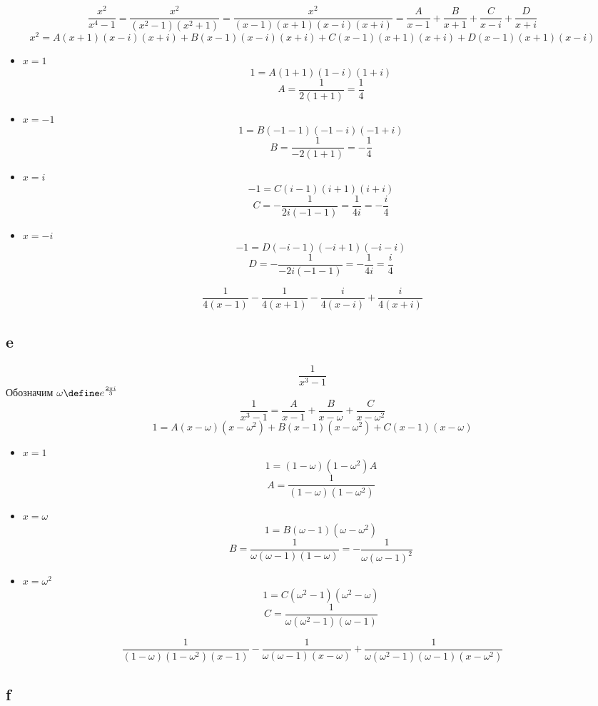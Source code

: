 $$ \frac{x^2}{x^4 - 1} = \frac{x^2}{(x^2 - 1)(x^2 + 1)} = \frac{x^2}{(x - 1)(x + 1)(x - i)(x + i)} = \frac{A}{x - 1} + \frac{B}{x + 1} + \frac{C}{x - i} + \frac{D}{x + i} $$
$$ x^2 = A(x + 1)(x - i)(x + i) + B(x - 1)(x - i)(x + i) + C(x - 1)(x + 1)(x + i) + D(x - 1)(x + 1)(x - i) $$
\begin{itemize}
	\item $ x = 1 $
    $$ 1 = A(1 + 1)(1 - i)(1 + i) $$
    $$ A = \frac1{2(1 + 1)} = \frac14 $$
    \item $ x = -1 $
    $$ 1 = B(-1 - 1)(-1 - i)(-1 + i) $$
    $$ B = \frac1{-2(1 + 1)} = -\frac14 $$
    \item $ x = i $
    $$ -1 = C(i - 1)(i + 1)(i + i) $$
    $$ C = -\frac1{2i(-1 - 1)} = \frac1{4i} = -\frac{i}4 $$
    \item $ x = -i $
    $$ -1 = D(-i - 1)(-i + 1)(-i - i) $$
    $$ D = -\frac1{-2i(-1 - 1)} = -\frac1{4i} = \frac{i}4 $$
\end{itemize}
$$ \frac1{4(x - 1)} - \frac1{4(x + 1)} - \frac{i}{4(x - i)} + \frac{i}{4(x + i)} $$

\subsection{e}

$$ \frac1{x^3 - 1} $$
Обозначим $ \omega \define e^{\frac{2\pi i}3} $
$$ \frac1{x^3 - 1} = \frac{A}{x - 1} + \frac{B}{x - \omega} + \frac{C}{x - \omega^2} $$
$$ 1 = A(x - \omega)(x - \omega^2) + B(x - 1)(x - \omega^2) + C(x - 1)(x - \omega) $$
\begin{itemize}
    \item $ x = 1 $
    $$ 1 = (1 - \omega)(1 - \omega^2)A $$
    $$ A = \frac1{(1 - \omega)(1 - \omega^2)} $$
	\item $ x = \omega $
    $$ 1 = B(\omega - 1)(\omega - \omega^2) $$
    $$ B = \frac1{\omega(\omega - 1)(1 - \omega)} = -\frac1{\omega(\omega - 1)^2} $$
    \item $ x = \omega^2 $
    $$ 1 = C(\omega^2 - 1)(\omega^2 - \omega) $$
    $$ C = \frac1{\omega(\omega^2 - 1)(\omega - 1)} $$
\end{itemize}
$$ \frac1{(1 - \omega)(1 - \omega^2)(x - 1)} - \frac1{\omega(\omega - 1)(x - \omega)} + \frac1{\omega(\omega^2 - 1)(\omega - 1)(x - \omega^2)} $$

\subsection{f}

